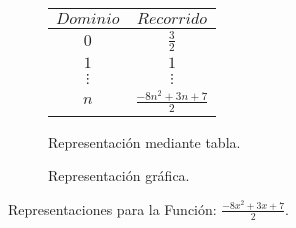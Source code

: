 \begin{figure}[h]
\centering
\begin{subfigure}[A]{0.3\textwidth}
\centering
\begin{tabular}{c|c}
$Dominio$ & $Recorrido$ \\ \hline
\hline
$0$ & $\frac{3}{2}$ \\ \hline
$1$ & $1$ \\ \hline
$\vdots$ & $\vdots$ \\ \hline
$n$& $\frac{-8 n^{2} + 3 n + 7}{2}$ \\ \hline
\end{tabular} 
\caption{Representación mediante tabla.}

\end{subfigure}%
\quad
\begin{subfigure}[B]{0.3\textwidth}
\centering



\caption{Representación gráfica.}

\end{subfigure}

\caption{Representaciones para la Función: $\frac{-8 x^{2} + 3 x + 7}{2}$.}

\end{figure}

